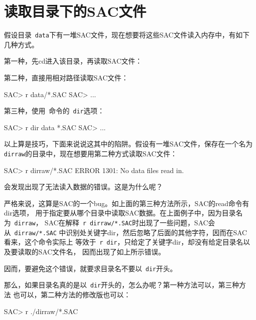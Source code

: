 \section{读取目录下的SAC文件}
\label{sec:read-dir}
假设目录~\verb+data+下有一堆SAC文件，现在想要将这些SAC文件读入内存中，有如下
几种方式。

第一种，先cd进入该目录，再读取SAC文件：

第二种，直接用相对路径读取SAC文件：
\begin{SACCode}
SAC> r data/*.SAC
SAC> ...
\end{SACCode}

第三种，使用~命令的~\verb+dir+选项：
\begin{SACCode}
SAC> r dir data *.SAC
SAC> ...
\end{SACCode}

以上算是技巧，下面来说说这其中的陷阱。假设有一堆SAC文件，保存在一个名为
\verb+dirraw+的目录中，现在想要用第二种方式读取SAC文件：
\begin{SACCode}
SAC> r dirraw/*.SAC
 ERROR 1301: No data files read in.
\end{SACCode}
会发现出现了无法读入数据的错误。这是为什么呢？

严格来说，这算是SAC的一个bug。如上面的第三种方法所示，SAC的read命令有dir选项，
用于指定要从哪个目录中读取SAC数据。在上面例子中，因为目录名为~\verb+dirraw+，
SAC在解释~\verb+r dirraw/*.SAC+时出现了一些问题，SAC会从~\verb+dirraw/*.SAC+
中识别处关键字dir，然后忽略了后面的其他字符，因而在SAC看来，这个命令实际上
等效于~\verb+r dir+，只给定了关键字dir，却没有给定目录名以及要读取的SAC文件名，
因而出现了如上所示错误。

因而，要避免这个错误，就要求目录名不要以~\verb+dir+开头。

那么，如果目录名真的是以~\verb+dir+开头的，怎么办呢？第一种方法可以，第三种方法
也可以，第二种方法的修改版也可以：
\begin{SACCode}
SAC> r ./dirraw/*.SAC
\end{SACCode}
